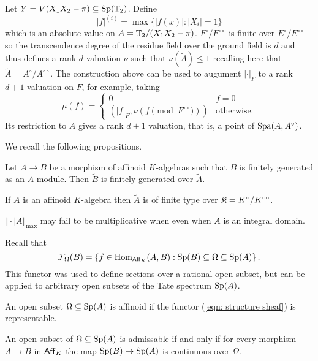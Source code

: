 \begin{example}
    Let $Y=V(X_{1}X_{2}-\pi)\subseteq\mathrm{Sp}(\mathbb{T}_{2})$. Define 
    $$|f|^{(i)}=\max\{|f(x)|:|X_{i}|=1\}$$ 
    which is an absolute value on $A=\mathbb{T}_{2}/(X_{1}X_{2}-\pi)$. $F^{\circ}/F^{\circ\circ}$ is finite over $E^{\circ}/E^{\circ\circ}$ so the transcendence degree of the residue field over the ground field is $d$ and thus defines a rank $d$ valuation $\nu$ such that $\nu(\widetilde{A})\leq 1$ recalling here that $\widetilde{A}=A^{\circ}/A^{\circ\circ}$. The construction above can be used to augument $|\cdot|_{F}$ to a rank $d+1$ valuation on $F$, for example, taking 
    $$\mu(f)=\begin{cases}
        0 & f=0 \\ (|f|_{F},\nu(f\pmod{F^{\circ\circ}})) & \text{otherwise.}
    \end{cases}$$
    Its restriction to $A$ gives a rank $d+1$ valuation, that is, a point of $\mathrm{Spa}(A,A^{\circ})$. 
\end{example}
We recall the following propositions. 
\begin{proposition}
    Let $A\to B$ be a morphism of affinoid $K$-algebras such that $B$ is finitely generated as an $A$-module. Then $\widetilde{B}$ is finitely generated over $\widetilde{A}$. 
\end{proposition}
\begin{corollary}
    If $A$ is an affinoid $K$-algebra then $\widetilde{A}$ is of finite type over $\mathfrak{K}=K^{\circ}/K^{\circ\circ}$.
\end{corollary}
\begin{example}
    $\Vert\cdot|A\Vert_{\max}$ may fail to be multiplicative when even when $A$ is an integral domain. 
\end{example} %
Recall that 
\begin{equation}\label{eqn: structure sheaf}
    \mathcal{F}_{\Omega}(B)=\left\{f\in\mathrm{Hom}_{\mathsf{Aff}_{K}}(A,B):\mathrm{Sp}(B)\subseteq\Omega\subseteq\mathrm{Sp}(A)\right\}.
\end{equation}
This functor was used to define sections over a rational open subset, but can be applied to arbitrary open subsets of the Tate spectrum $\mathrm{Sp}(A)$. 
\begin{definition}\label{def: affinoid open subset}
    An open subset $\Omega\subseteq\mathrm{Sp}(A)$ is affinoid if the functor (\ref{eqn: structure sheaf}) is representable.
\end{definition}
\begin{definition}\label{def: admissable open subset}
    An open subset of $\Omega\subseteq\mathrm{Sp}(A)$ is admissable if and only if for every morphism $A\to B$ in $\mathsf{Aff}_{K}$ the map $\mathrm{Sp}(B)\to\mathrm{Sp}(A)$ is continuous over $\Omega$. 
\end{definition}
